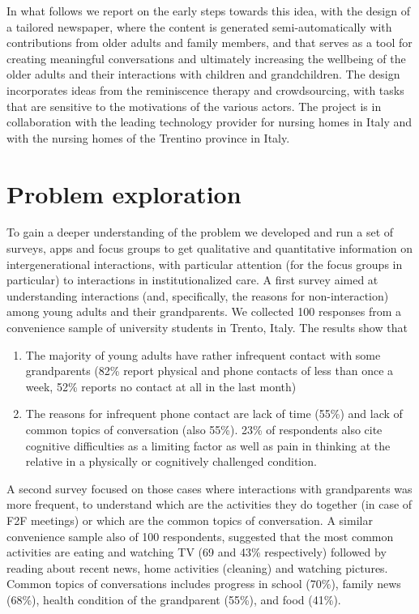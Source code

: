 \documentclass[runningheads,a4paper,oribibl]{llncs}
\begin{document}
In what follows we report on the early steps towards this idea, with the design of a tailored newspaper, where the content is generated semi-automatically with contributions from older adults and family members, and that serves as a tool for creating meaningful conversations and ultimately increasing the wellbeing of the older adults and their interactions with children and grandchildren. The design incorporates ideas from the reminiscence therapy and crowdsourcing, with tasks that are sensitive to the motivations of the various actors.  The project is in collaboration with the leading technology provider for nursing homes in Italy and with the nursing homes of the Trentino province in Italy.

\section{Problem exploration}

To gain a deeper understanding of the problem we developed and run a set of surveys, apps and focus groups to get qualitative and quantitative information on intergenerational interactions, with particular attention (for the focus groups in particular) to interactions in institutionalized care.
A first survey aimed at understanding interactions (and, specifically, the reasons for non-interaction) among young adults and their grandparents. We collected 100 responses from a convenience sample of university students in Trento, Italy. The results show that 
\begin{enumerate}
\item The majority of young adults have rather infrequent contact with some grandparents (82\% report physical and phone contacts of less than once a week, 52\% reports no contact at all in the last month)
\item The reasons for infrequent phone contact are lack of time (55\%) and lack of common topics of conversation (also 55\%). 23\% of respondents also cite cognitive difficulties as a limiting factor as well as pain in thinking at the relative in a physically or cognitively challenged condition.
\end{enumerate}


A second survey focused on those cases where interactions with grandparents was more frequent, to understand which are the activities they do together (in case of F2F meetings) or which are the common topics of conversation. A similar convenience sample also of 100 respondents, suggested that the most common activities are eating and watching TV (69 and 43\% respectively) followed by reading about recent news, home activities (cleaning) and watching pictures. Common topics of conversations includes progress in school (70\%), family news (68\%), health condition of the grandparent (55\%), and food (41\%).	
\end{document}

